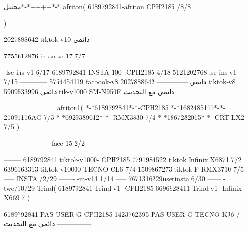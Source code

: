 مجثثل*-*++++*-*
afriton(
6189792841-afriton CPH2185  /8/8

)

2027888642 tiktok-v10
دائمي

7755612876-in-on-se-17 7/7

-lse-ins-v1 6/17
6189792841-INSTA-100- CPH2185 4/18
5121202768-lse-ins-v1 7/15
------------
5754454119 facbook-v8
دائمي
--------------
2027888642 tiktok-v8
دائمي
5909533996 tik-v1000  SM-N950F
دائمي مع التحديث

__________
afriton1(
*-*6189792841*-*-CPH2185
*-*1682485111*-*- 21091116AG  7/3
*-*6929389612*-*-  RMX3830  7/4
*-*1967282015*-*-  CRT-LX2  7/5
)


------
------------
-face-15 2/2

--------
6189792841 tiktok-v1000- CPH2185 
7791984522 tiktok Infinix X6871  7/2
6396163313 tiktok-v10000 TECNO CL6  7/4
1509867273 tiktok-F RMX3710  7/5
-----
 INSTA /2/29
-------
-m-v14 1/14
-----
7671316229userinsta 6/30
------
-twe/10/29
Trind(
6189792841-Trind-v1- CPH2185 
6696928411-Trind-v1- Infinix X669 7\2
)


6189792841-PAS-USER-G CPH2185 
1423762395-PAS-USER-G TECNO KJ6  /دائمي مع التحديث
    ---------------

